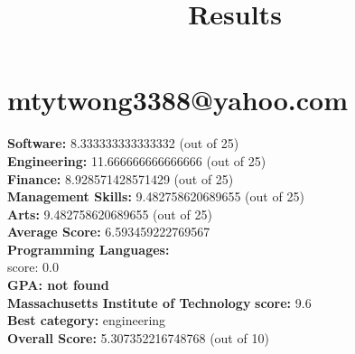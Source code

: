\documentclass{article}
\title{Results}
\begin{document}
\section{mtytwong3388@yahoo.com}
\textbf{Software:} 8.333333333333332 (out of 25)\\
\textbf{Engineering: } 11.666666666666666 (out of 25)\\
\textbf{Finance:} 8.928571428571429 (out of 25)\\
\textbf{Management Skills:} 9.482758620689655 (out of 25)\\
\textbf{Arts:} 9.482758620689655 (out of 25)\\
\textbf{Average Score: } 6.593459222769567\\
\textbf{Programming Languages:} \\
score: 0.0\\
\textbf{GPA: not found}\\
\textbf{Massachusetts Institute of Technology} \textbf{score:} 9.6\\
\textbf{Best category: } engineering\\
\textbf{Overall Score: }5.307352216748768 (out of 10)
\end{document}
